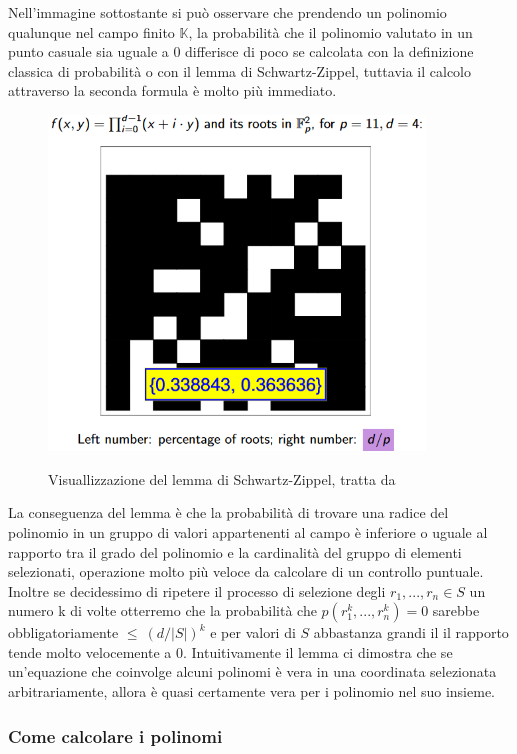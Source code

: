 Nell'immagine sottostante si può osservare che prendendo un polinomio qualunque nel campo finito $\mathbb{K}$, la
probabilità che il polinomio valutato in un punto casuale sia uguale a 0 differisce di poco se calcolata con la
definizione classica di probabilità o con il lemma di Schwartz-Zippel, tuttavia il calcolo attraverso la seconda formula è molto più immediato.
\begin{figure}[H]
    \centering
    \includegraphics[width=10cm]{./chapters/1.state-of-art/images/7.schwartz_zippel_lemma.png}
    \label{fig:schwartz-zippel-lemma}
    \captionsetup{justification=centering}
    \caption{Visuallizzazione del lemma di Schwartz-Zippel, tratta da \cite{23-schwartz-zippel}}
\end{figure}
\clearpage

La conseguenza del lemma è che la probabilità di trovare una radice del polinomio in un gruppo di valori appartenenti al
campo è inferiore o uguale al rapporto tra il grado del polinomio e la cardinalità del gruppo di elementi selezionati,
operazione molto più veloce da calcolare di un controllo puntuale. Inoltre se decidessimo di ripetere il processo di
selezione degli $r_1,...,r_n \in S$ un numero k di volte otterremo che la probabilità che $p(r^k_1,...,r^k_n) = 0$
sarebbe obbligatoriamente $\le \ (d/|S|)^k$  e per valori di $S$ abbastanza grandi il il rapporto tende molto velocemente
a 0. Intuitivamente il lemma ci dimostra che se un'equazione che coinvolge alcuni polinomi è vera in una coordinata
selezionata arbitrariamente, allora è quasi certamente vera per i polinomio nel suo insieme.

\subsubsection{Come calcolare i polinomi}

